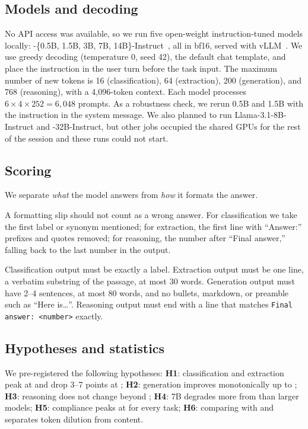 \subsection{Models and decoding}

No API access was available, so we run five open-weight instruction-tuned models locally: \qwen-\{0.5B, 1.5B, 3B, 7B, 14B\}-Instruct~\citep{qwen2025qwen25}, all in bf16, served with vLLM~\citep{kwon2023efficient}.
We use greedy decoding (temperature 0, seed 42), the default chat template, and place the instruction in the user turn before the task input.
The maximum number of new tokens is 16 (classification), 64 (extraction), 200 (generation), and 768 (reasoning), with a 4{,}096-token context.
Each model processes $6 \times 4 \times 252 = 6{,}048$ prompts.
As a robustness check, we rerun 0.5B and 1.5B with the instruction in the system message.
We also planned to run Llama-3.1-8B-Instruct and \qwen-32B-Instruct, but other jobs occupied the shared GPUs for the rest of the session and these runs could not start.

\subsection{Scoring}

We separate \emph{what} the model answers from \emph{how} it formats the answer.

A formatting slip should not count as a wrong answer.
For classification we take the first label or synonym mentioned; for extraction, the first line with ``Answer:'' prefixes and quotes removed; for reasoning, the number after ``Final answer,'' falling back to the last number in the output.

Classification output must be exactly a label.
Extraction output must be one line, a verbatim substring of the passage, at most 30 words.
Generation output must have 2--4 sentences, at most 80 words, and no bullets, markdown, or preamble such as ``Here is\ldots''.
Reasoning output must end with a line that matches \texttt{Final answer: <number>} exactly.

\subsection{Hypotheses and statistics}
\label{sec:hypotheses}

We pre-registered the following hypotheses:
{\bf H1}: classification and extraction peak at \standard and drop 3--7 points at \exhaustive;
{\bf H2}: generation improves monotonically up to \detailed;
{\bf H3}: reasoning does not change beyond \concise;
{\bf H4}: 7B degrades more from \exhaustive than larger models;
{\bf H5}: compliance peaks at \standard for every task;
{\bf H6}: comparing \padded with \standard and \exhaustive separates token dilution from content.

